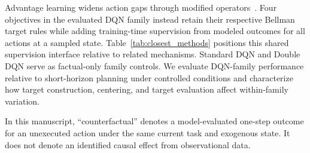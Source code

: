 \documentclass[11pt]{article}
\begin{document}
Advantage learning widens action gaps through modified operators~\cite{bellemare2016gap}. Four objectives in the evaluated DQN family instead retain their respective Bellman target rules while adding training-time supervision from modeled outcomes for all actions at a sampled state. Table~\ref{tab:closest_methods} positions this shared supervision interface relative to related mechanisms. Standard DQN and Double DQN serve as factual-only family controls. We evaluate DQN-family performance relative to short-horizon planning under controlled conditions and characterize how target construction, centering, and target evaluation affect within-family variation.

In this manuscript, ``counterfactual'' denotes a model-evaluated one-step outcome for an unexecuted action under the same current task and exogenous state. It does not denote an identified causal effect from observational data.
\end{document}

